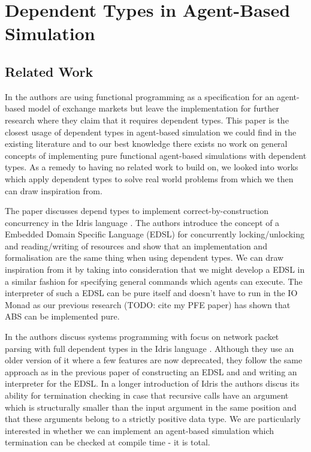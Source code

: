 \section{Dependent Types in Agent-Based Simulation}
\label{sec:dep_absconcepts}

\subsection{Related Work}
In \cite{botta_functional_2011} the authors are using functional programming as a specification for an agent-based model of exchange markets but leave the implementation for further research where they claim that it requires dependent types. This paper is the closest usage of dependent types in agent-based simulation we could find in the existing literature and to our best knowledge there exists no work on general concepts of implementing pure functional agent-based simulations with dependent types. As a remedy to having no related work to build on, we looked into works which apply dependent types to solve real world problems from which we then can draw inspiration from. 

The paper \cite{brady_correct-by-construction_2010} discusses depend types to implement correct-by-construction concurrency in the Idris language \cite{brady_idris_2013}. The authors introduce the concept of a Embedded Domain Specific Language (EDSL) for concurrently locking/unlocking and reading/writing of resources and show that an implementation and formalisation are the same thing when using dependent types. We can draw inspiration from it by taking into consideration that we might develop a EDSL in a similar fashion for specifying general commands which agents can execute. The interpreter of such a EDSL can be pure itself and doesn't have to run in the IO Monad as our previous research (TODO: cite my PFE paper) has shown that ABS can be implemented pure.

In \cite{brady_idris_2011} the authors discuss systems programming with focus on network packet parsing with full dependent types in the Idris language \cite{brady_idris_2013}. Although they use an older version of it where a few features are now deprecated, they follow the same approach as in the previous paper of constructing an EDSL and and writing an interpreter for the EDSL. In a longer introduction of Idris the authors discus its ability for termination checking in case that recursive calls have an argument which is structurally smaller than the input argument in the same position and that these arguments belong to a strictly positive data type. We are particularly interested in whether we can implement an agent-based simulation which termination can be checked at compile time - it is total.

